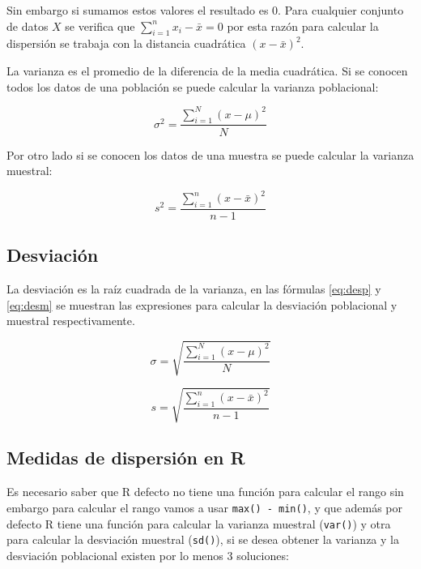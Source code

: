 \documentclass[]{book}
\begin{document}
Sin embargo si sumamos estos valores el resultado es \(0\). Para cualquier conjunto de datos \(X\) se verifica que \(\sum_{i=1}^n{x_i-\bar{x}}=0\) por esta razón para calcular la dispersión se trabaja con la distancia cuadrática \(\left(x-\bar{x}\right)^2\).

La varianza es el promedio de la diferencia de la media cuadrática. Si se conocen todos los datos de una población se puede calcular la varianza poblacional:

\begin{equation} 
  \sigma^2 = \dfrac{\sum_{i=1}^{N}\left(x- \mu \right)^2}{N}
  \label{eq:varp}
\end{equation}

Por otro lado si se conocen los datos de una muestra se puede calcular la varianza muestral:

\begin{equation} 
  s^2 = \dfrac{\sum_{i=1}^{n}\left(x- \bar{x} \right)^2}{n-1}
  \label{eq:varm}
\end{equation}

\hypertarget{desviacion}{%
\subsection{Desviación}\label{desviacion}}

La desviación es la raíz cuadrada de la varianza, en las fórmulas \eqref{eq:desp} y \eqref{eq:desm} se muestran las expresiones para calcular la desviación poblacional y muestral respectivamente.

\begin{equation} 
  \sigma = \sqrt{\dfrac{\sum_{i=1}^{N}\left(x- \mu \right)^2}{N}}
  \label{eq:desp}
\end{equation}

\begin{equation} 
  s = \sqrt{\dfrac{\sum_{i=1}^{n}\left(x- \bar{x} \right)^2}{n-1}}
  \label{eq:desm}
\end{equation}

\hypertarget{medidas-de-dispersion-en-r}{%
\subsection{Medidas de dispersión en R}\label{medidas-de-dispersion-en-r}}

Es necesario saber que R defecto no tiene una función para calcular el rango sin embargo para calcular el rango vamos a usar \texttt{max()\ -\ min()}, y que además por defecto R tiene una función para calcular la varianza muestral (\texttt{var()}) y otra para calcular la desviación muestral (\texttt{sd()}), si se desea obtener la varianza y la desviación poblacional existen por lo menos 3 soluciones:
\end{document}
